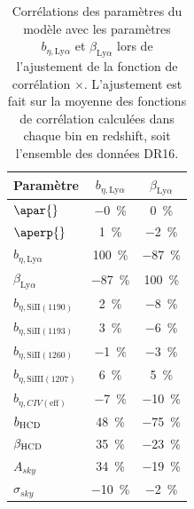 \begin{table}[]
  \centering
  \caption{Corrélations des paramètres du modèle avec les paramètres $b_{\eta,\mathrm{Ly}\alpha}$ et $\beta_{\mathrm{Ly}\alpha}$ lors de l'ajustement de la fonction de corrélation \lya{}$\times$\lya{}. L'ajustement est fait sur la moyenne des fonctions de corrélation calculées dans chaque bin en redshift, soit l'ensemble des données DR16.}
  \label{tab:corr_bias_lya}
  \begin{tabular}{lcc}
    \toprule
    Paramètre  & $b_{\eta,\mathrm{Ly}\alpha}$ & $\beta_{\mathrm{Ly}\alpha}$ \\
    \midrule
    $\apar{} $ & \SI{-0}{\percent} & \SI{0}{\percent}\\
    $\aperp{} $ & \SI{1}{\percent} & \SI{-2}{\percent} \\
    $b_{\eta, \mathrm{Ly}\alpha} $ & \SI{100}{\percent} & \SI{-87}{\percent} \\
    $\beta_{\mathrm{Ly}\alpha} $ & \SI{-87}{\percent} &  \SI{100}{\percent} \\
    $b_{\eta, \mathrm{SiII}(1190)} $ & \SI{2}{\percent} & \SI{-8}{\percent} \\
    $b_{\eta, \mathrm{SiII}(1193)} $ & \SI{3}{\percent} & \SI{-6}{\percent} \\
    $b_{\eta, \mathrm{SiII}(1260)} $ & \SI{-1}{\percent} & \SI{-3}{\percent} \\
    $b_{\eta, \mathrm{SiIII}(1207)} $ & \SI{6}{\percent} & \SI{5}{\percent}\\
    $b_{\eta, CIV(\mathrm{eff})} $ &\SI{-7}{\percent} & \SI{-10}{\percent}\\
    $b_{\textsc{HCD}} $ & \SI{48}{\percent} & \SI{-75}{\percent}\\
    $\beta_{\textsc{HCD}} $ & \SI{35}{\percent} & \SI{-23}{\percent}\\
    $A_{sky} $ & \SI{34}{\percent} & \SI{-19}{\percent}\\
    $\sigma_{sky} $ & \SI{-10}{\percent} & \SI{-2}{\percent}\\
    \bottomrule
\end{tabular}
\end{table}

